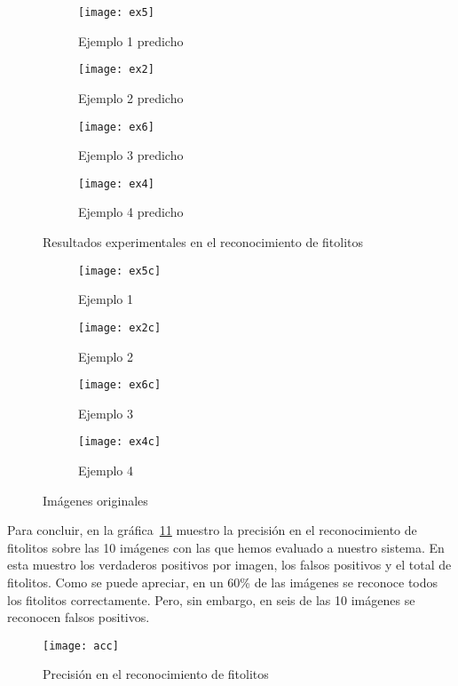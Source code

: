 \begin{figure}
	\centering
	\begin{subfigure}[b]{0.45\textwidth}
        \texttt{[image: ex5]}
        \caption{Ejemplo 1 predicho}
        \label{subfig:fej1}
    \end{subfigure}
    \begin{subfigure}[b]{0.45\textwidth}
        \texttt{[image: ex2]}
        \caption{Ejemplo 2 predicho}
        \label{subfig:fej2}
    \end{subfigure}
    \begin{subfigure}[b]{0.45\textwidth}
        \texttt{[image: ex6]}
        \caption{Ejemplo 3 predicho}
        \label{subfig:fe3}
    \end{subfigure}
    \begin{subfigure}[b]{0.45\textwidth}
        \texttt{[image: ex4]}
        \caption{Ejemplo 4 predicho}
        \label{subfig:fe4}
    \end{subfigure}
        \caption{Resultados experimentales en el reconocimiento de fitolitos}
	\label{fig:5.17}
\end{figure}

\begin{figure}
	\centering
	\begin{subfigure}[b]{0.45\textwidth}
        \texttt{[image: ex5c]}
        \caption{Ejemplo 1}
        \label{subfig:fej1}
    \end{subfigure}
    \begin{subfigure}[b]{0.45\textwidth}
        \texttt{[image: ex2c]}
        \caption{Ejemplo 2}
        \label{subfig:fej2}
    \end{subfigure}
    \begin{subfigure}[b]{0.45\textwidth}
        \texttt{[image: ex6c]}
        \caption{Ejemplo 3}
        \label{subfig:fe3}
    \end{subfigure}
    \begin{subfigure}[b]{0.45\textwidth}
        \texttt{[image: ex4c]}
        \caption{Ejemplo 4}
        \label{subfig:fe4}
    \end{subfigure}
        \caption{Imágenes originales}
	\label{fig:5.18}
\end{figure}

Para concluir, en la gráfica~\ref{fig:acc} muestro la precisión en el reconocimiento de fitolitos sobre las 10 imágenes con las que hemos evaluado a nuestro sistema. En esta muestro los verdaderos positivos por imagen, los falsos positivos y el total de fitolitos. Como se puede apreciar, en un 60\% de las imágenes se reconoce todos los fitolitos correctamente. Pero, sin embargo, en seis de las 10 imágenes se reconocen falsos positivos.

\begin{figure}
\centering
\texttt{[image: acc]}
\caption{Precisión en el reconocimiento de fitolitos}
\label{fig:acc}
\end{figure}